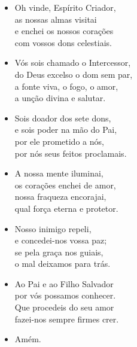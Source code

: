 \begin{itemize}
  \item[] Oh vinde, Espírito Criador, \\
        as nossas almas visitai \\
        e enchei os nossos corações \\
        com vossos dons celestiais.

  \item[] Vós sois chamado o Intercessor, \\
        do Deus excelso o dom sem par, \\
        a fonte viva, o fogo, o amor, \\
        a unção divina e salutar.

  \item[] Sois doador dos sete dons, \\
        e sois poder na mão do Pai, \\
        por ele prometido a nós, \\
        por nós seus feitos proclamais.

  \item[] A nossa mente iluminai, \\
        os corações enchei de amor, \\
        nossa fraqueza encorajai, \\
        qual força eterna e protetor.

  \item[] Nosso inimigo repeli, \\
        e concedei-nos vossa paz; \\
        se pela graça nos guiais, \\
        o mal deixamos para trás.

  \item[] Ao Pai e ao Filho Salvador \\
        por vós possamos conhecer. \\
        Que procedeis do seu amor \\
        fazei-nos sempre firmes crer.

  \item[] Amém.
\end{itemize}